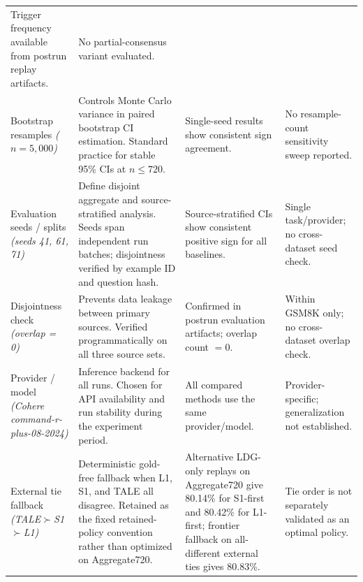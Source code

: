 \begin{table}[H]
{\begin{tabular}{p{}p{}p{}p{}}
  Trigger frequency available from postrun replay artifacts. &
  No partial-consensus variant evaluated. \\
\addlinespace
Bootstrap resamples \newline \textit{($n = 5{,}000$)} &
  Controls Monte Carlo variance in paired bootstrap CI estimation.
  Standard practice for stable 95\% CIs at $n \leq 720$. &
  Single-seed results show consistent sign agreement. &
  No resample-count sensitivity sweep reported. \\
\addlinespace
Evaluation seeds / splits \newline \textit{(seeds 41, 61, 71)} &
  Define disjoint aggregate and source-stratified analysis.
  Seeds span independent run batches; disjointness verified by example ID and question hash. &
  Source-stratified CIs show consistent positive sign for all baselines. &
  Single task/provider; no cross-dataset seed check. \\
\addlinespace
Disjointness check \newline \textit{(overlap = 0)} &
  Prevents data leakage between primary sources.
  Verified programmatically on all three source sets. &
  Confirmed in postrun evaluation artifacts; overlap count $= 0$. &
  Within GSM8K only; no cross-dataset overlap check. \\
\addlinespace
Provider / model \newline \textit{(Cohere command-r-plus-08-2024)} &
  Inference backend for all runs.
  Chosen for API availability and run stability during the experiment period. &
  All compared methods use the same provider/model. &
  Provider-specific; generalization not established. \\
\addlinespace
External tie fallback \newline \textit{(TALE$\succ$S1$\succ$L1)} &
  Deterministic gold-free fallback when L1, S1, and TALE all disagree.
  Retained as the fixed retained-policy convention rather than optimized on Aggregate720. &
  Alternative LDG-only replays on Aggregate720 give 80.14\% for S1-first and 80.42\% for L1-first; frontier fallback on all-different external ties gives 80.83\%. &
  Tie order is not separately validated as an optimal policy. \\
\bottomrule
\end{tabular}}
\end{table}
